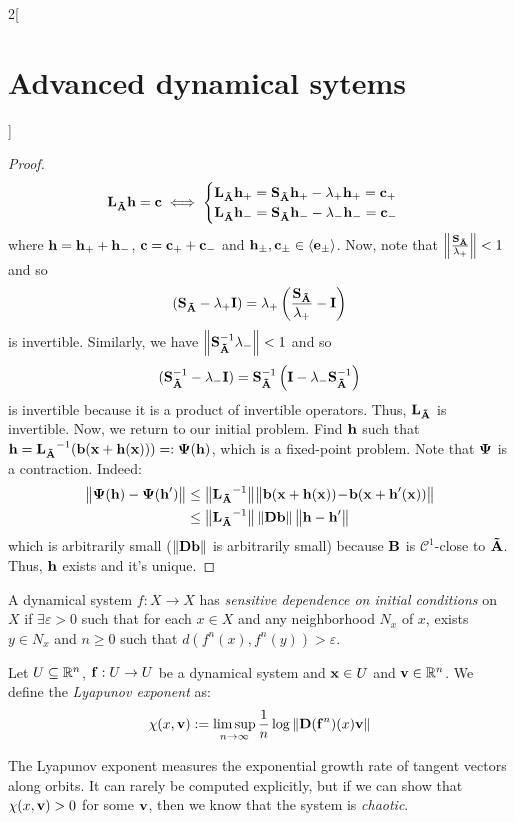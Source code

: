 \documentclass[../../../main_math.tex]{subfiles}
\begin{document}
\begin{multicols}{2}[\section{Advanced dynamical sytems}]
\begin{proof}
    $$
      \vf{L}_{\vf{\tilde{A}}}\vf{h}=\vf{c}\iff \begin{cases}
        \vf{L}_{\vf{\tilde{A}}}\vf{h}_+=\vf{S}_{\vf{\tilde{A}}}\vf{h}_+-\lambda_+\vf{h}_+=\vf{c}_+ \\
        \vf{L}_{\vf{\tilde{A}}}\vf{h}_-=\vf{S}_{\vf{\tilde{A}}}\vf{h}_--\lambda_-\vf{h}_-=\vf{c}_-
      \end{cases}
    $$
    where $\vf{h}=\vf{h}_++\vf{h}_-$, $\vf{c}=\vf{c}_++\vf{c}_-$ and $\vf{h}_\pm,\vf{c}_\pm\in \langle \vf{e}_\pm\rangle$. Now, note that $\norm{\frac{\vf{S}_{\vf{\tilde{A}}}}{\lambda_+}}<1$ and so
    $$
      (\vf{S}_{\vf{\tilde{A}}}-\lambda_+\vf{I})=\lambda_+\left(\frac{\vf{S}_{\vf{\tilde{A}}}}{\lambda_+}-\vf{I}\right)
    $$
    is invertible. Similarly, we have $\norm{\vf{S}_{\vf{\tilde{A}}}^{-1}\lambda_-}<1$ and so
    $$
      (\vf{S}_{\vf{\tilde{A}}}^{-1}-\lambda_-\vf{I})=\vf{S}_{\vf{\tilde{A}}}^{-1}\left(\vf{I}-\lambda_-\vf{S}_{\vf{\tilde{A}}}^{-1}\right)
    $$
    is invertible because it is a product of invertible operators. Thus, $\vf{L}_{\vf{\tilde{A}}}$ is invertible. Now, we return to our initial problem. Find $\vf{h}$ such that $\vf{h}= {\vf{L}_{\vf{\tilde{A}}}}^{-1}(\vf{b}(\vf{x}+\vf{h}(\vf{x})))=:\vf\Psi(\vf{h})$, which is a fixed-point problem. Note that $\vf\Psi$ is a contraction. Indeed:
    \begin{align*}
      \norm{\vf\Psi(\vf{h})-\vf\Psi(\vf{h}')} & \leq \norm{{\vf{L}_{\vf{\tilde{A}}}}^{-1}}\!\norm{\vf{b}(\vf{x}+\vf{h}(\vf{x}))\!-\!\vf{b}(\vf{x}+\vf{h}'(\vf{x}))} \\
                                              & \leq \norm{{\vf{L}_{\vf{\tilde{A}}}}^{-1}}\norm{\vf{Db}}\norm{\vf{h}-\vf{h}'}
    \end{align*}
    which is arbitrarily small ($\norm{\vf{Db}}$ is arbitrarily small) because $\vf{B}$ is $\mathcal{C}^1$-close to $\vf{\tilde{A}}$. Thus, $\vf{h}$ exists and it's unique.
  \end{proof}
  \begin{definition}
    A dynamical system $f : X\rightarrow X$ has \emph{sensitive dependence on initial conditions} on $X$ if $\exists\varepsilon >0$ such that for each $x\in X$ and any neighborhood $N_x$ of $x$, exists $y \in N_x$ and $n \geq  0$ such that $d(f^n(x),f^n(y)) > \varepsilon$.
  \end{definition}
  \begin{definition}
    Let $U\subseteq \RR^n$, $\vf{f}:U\to U$ be a dynamical system and $\vf{x}\in U$ and $\vf{v}\in\RR^n$. We define the \emph{Lyapunov exponent} as:
    $$
      \chi(x,\vf{v}):=\limsup_{n\to\infty}\frac{1}{n}\log\norm{\vf{D}(\vf{f}^n)(x)\vf{v}}
    $$
  \end{definition}
  \begin{remark}
    The Lyapunov exponent measures the exponential growth rate of tangent vectors along orbits. It can rarely be computed explicitly, but if we can show that $\chi(x,\vf{v})>0$ for some $\vf{v}$, then we know that the system is \emph{chaotic}.
  \end{remark}

\end{multicols}
\end{document}
